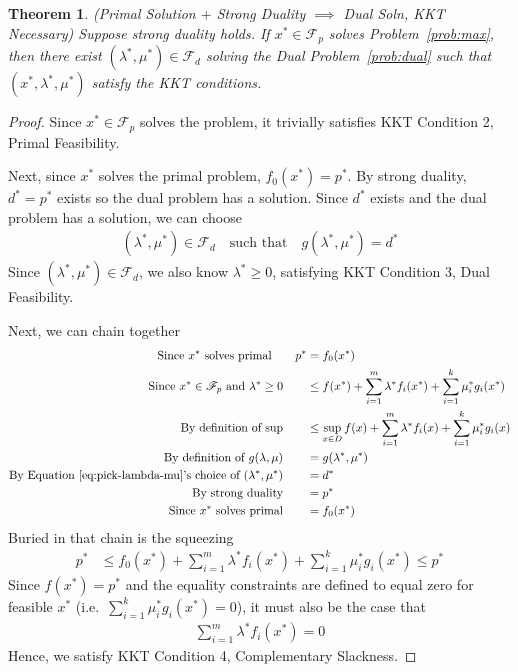 \documentclass[12pt]{book}
\numberwithin{equation}{section} %
\theoremstyle{plain}
\newtheorem{thm}{Theorem}[section]
\theoremstyle{definition}
\theoremstyle{remark}
\begin{document}
\begin{thm}{\emph{(Primal Solution $+$ Strong Duality $\implies$ Dual
  Soln, KKT Necessary)}}
Suppose strong duality holds.  If $x^*\in\mathscr{F}_p$ solves
Problem~\ref{prob:max}, then there exist
$(\lambda^*,\mu^*)\in\mathscr{F}_d$ solving the Dual
Problem~\ref{prob:dual} such that $(x^*,\lambda^*,\mu^*)$ satisfy the
KKT conditions.
\end{thm}
\begin{proof}
Since $x^*\in\mathscr{F}_p$ solves the problem, it trivially satisfies
KKT Condition 2, Primal Feasibility.

Next, since $x^*$ solves the primal problem, $f_0(x^*)=p^*$. By strong
duality, $d^*=p^*$ exists so the dual problem has a solution. Since
$d^*$ exists and the dual problem has a solution, we can choose
\begin{align}
  \label{eq:pick-lambda-mu}
  (\lambda^*,\mu^*) \in \mathscr{F}_d
  \quad \text{such that}
  \quad g(\lambda^*,\mu^*) = d^*
\end{align}
Since $(\lambda^*,\mu^*)\in\mathscr{F}_d$, we also know $\lambda^*\geq
0$, satisfying KKT Condition 3, Dual Feasibility.

Next, we can chain together
\begin{align*}
  \text{Since $x^*$ solves primal} \qquad p^* &= f_0(x^*) \\
  \text{Since $x^*\in\mathscr{F}_p$ and $\lambda^*\geq 0$} \qquad
  &\leq f(x^*) + \sum^m_{i=1} \lambda^* f_i(x^*)
  + \sum^k_{i=1} \mu_i^* g_i(x^*) \\
  \text{By definition of sup} \qquad
  &\leq \sup_{x\in D} f(x) + \sum^m_{i=1} \lambda^* f_i(x)
  + \sum^k_{i=1} \mu_i^* g_i(x) \\
  \text{By definition of $g(\lambda,\mu)$} \qquad
  &= g(\lambda^*,\mu^*) \\
  \text{By Equation~\ref{eq:pick-lambda-mu}'s
    choice of $(\lambda^*,\mu^*)$} \qquad &= d^* \\
  \text{By strong duality}\qquad
  &= p^*\\
  \text{Since $x^*$ solves primal}\qquad
  &= f_0(x^*)
\end{align*}
Buried in that chain is the squeezing
\begin{align*}
  p^*
  &\leq f_0(x^*) + \sum^m_{i=1} \lambda^* f_i(x^*)
  + \sum^k_{i=1} \mu_i^* g_i(x^*)
  \leq p^*
\end{align*}
Since $f(x^*)=p^*$ and the equality constraints are defined to equal
zero for feasible $x^*$ (i.e.\ $\sum^k_{i=1}\mu^*_ig_i(x^*)=0$), it must
also be the case that
\begin{align*}
  \sum^m_{i=1} \lambda^* f_i(x^*)
  =0
\end{align*}
Hence, we satisfy KKT Condition 4, Complementary Slackness.


\end{proof}
\end{document}
